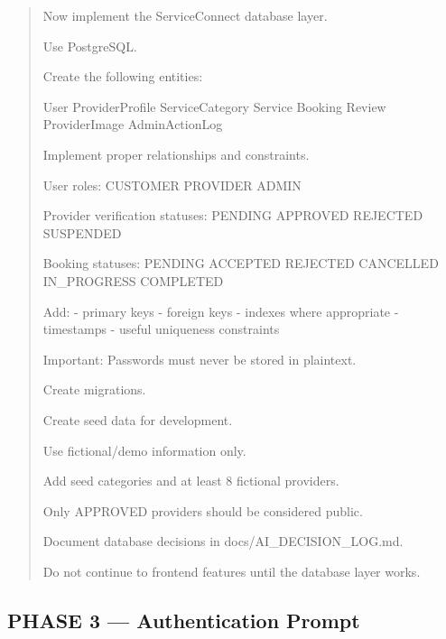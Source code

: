 \begin{quote}
Now implement the ServiceConnect database layer.

Use PostgreSQL.

Create the following entities:

User
ProviderProfile
ServiceCategory
Service
Booking
Review
ProviderImage
AdminActionLog

Implement proper relationships and constraints.

User roles:
CUSTOMER
PROVIDER
ADMIN

Provider verification statuses:
PENDING
APPROVED
REJECTED
SUSPENDED

Booking statuses:
PENDING
ACCEPTED
REJECTED
CANCELLED
IN_PROGRESS
COMPLETED

Add:
- primary keys
- foreign keys
- indexes where appropriate
- timestamps
- useful uniqueness constraints

Important:
Passwords must never be stored in plaintext.

Create migrations.

Create seed data for development.

Use fictional/demo information only.

Add seed categories and at least 8 fictional providers.

Only APPROVED providers should be considered public.

Document database decisions in docs/AI_DECISION_LOG.md.

Do not continue to frontend features until the database layer works.
\end{quote}

\subsection*{PHASE 3 --- Authentication Prompt}

